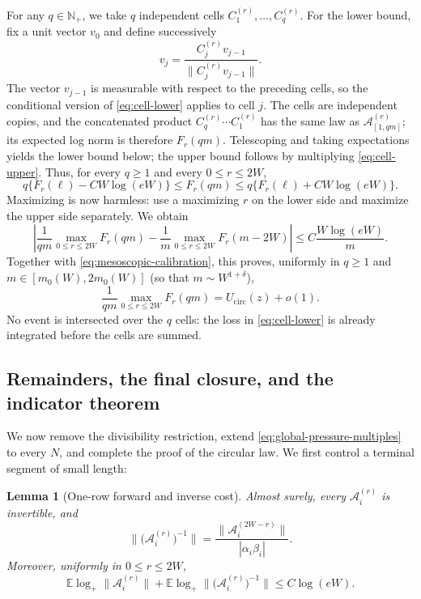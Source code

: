 \documentclass[11pt,reqno]{amsart}
\numberwithin{equation}{section}
\newtheorem{lemma}[theorem]{Lemma}
\theoremstyle{definition}
\theoremstyle{remark}
\newcommand{\E}{\mathbb E}
\newcommand{\1}{\mathbf 1}
\newcommand{\cir}{\mathrm{circ}}
\begin{document}
For any $q\in\mathbb{N}_+$, we take $q$ independent cells $C_1^{(r)},\ldots,C_q^{(r)}$.  For the lower
bound, fix a unit vector $v_0$ and define successively
\[
 v_j=\frac{C_j^{(r)}v_{j-1}}{\|C_j^{(r)}v_{j-1}\|}.
\]
The vector $v_{j-1}$ is measurable with respect to the preceding cells, so
the conditional version of \eqref{eq:cell-lower} applies to cell $j$.
The cells are independent copies, and the concatenated product
$C_q^{(r)}\cdots C_1^{(r)}$ has the same law as
$\mathcal A_{[1,qm]}^{(r)}$; its expected log norm is therefore $F_r(qm)$.
Telescoping and taking expectations yields the lower bound below; the upper
bound follows by multiplying \eqref{eq:cell-upper}.  Thus, for every
\(q\geq1\) and every \(0\leq r\leq2W\),
\begin{equation}\label{eq:pressure-lift-r}
 q\{F_r(\ell)-CW\log(eW)\}
 \le F_r(qm)
 \le q\{F_r(\ell)+CW\log(eW)\}.
\end{equation}
Maximizing is now harmless: use a maximizing $r$ on the lower side and
maximize the upper side separately.  We obtain
\begin{equation}\label{eq:pressure-lift-max}
 \left|\frac1{qm}\max_{0\le r\le 2W}F_r(qm)
 -\frac1m\max_{0\le r\le 2W}F_r(m-2W)\right|
 \le C\frac{W\log(eW)}m.
\end{equation}
Together with \eqref{eq:mesoscopic-calibration}, this proves, uniformly in
\(q\geq1\) and \(m\in[m_0(W),2m_0(W)]\) (so that
\(m\sim W^{1+\delta}\)),
\begin{equation}\label{eq:global-pressure-multiples}
 \frac1{qm}\max_{0\leq r\leq2W}F_r(qm)=U_{\cir}(z)+o(1).
\end{equation}
No event is intersected over the $q$ cells: the loss in
\eqref{eq:cell-lower} is already integrated before the cells are summed.

\subsection{Remainders, the final closure, and the indicator theorem}
\label{sec:global-closure}
We now remove the divisibility restriction, extend
\eqref{eq:global-pressure-multiples} to every \(N\), and complete the
proof of the circular law.
We first control a terminal segment of small length:

\begin{lemma}[One-row forward and inverse cost]\label{lem:inverse-row}
Almost surely, every $\mathcal A_i^{(r)}$ is invertible, and
\begin{equation}\label{eq:inverse-exterior-identity}
 \|\big(\mathcal A_i^{(r)}\big)^{-1}\|
 =\frac{\|\mathcal A_i^{(2W-r)}\|}{|\alpha_i\beta_i|}.
\end{equation}
Moreover, uniformly in \(0\leq r\leq2W\),
\begin{equation}\label{eq:one-row-log-cost}
 \E\log_+\|\mathcal A_i^{(r)}\|
 +\E\log_+\|\big(\mathcal A_i^{(r)}\big)^{-1}\|
 \le C\log(eW).
\end{equation}
\end{lemma}
\end{document}
